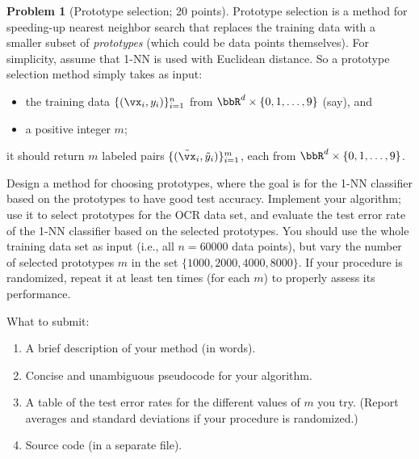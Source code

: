 \documentclass[11pt]{article}
\theoremstyle{definition}
\newtheorem{problem}{Problem}
\begin{document}
\begin{problem}[Prototype selection; 20 points]
  Prototype selection is a method for speeding-up nearest neighbor search that
  replaces the training data with a smaller subset of \emph{prototypes} (which
  could be data points themselves).
  For simplicity, assume that 1-NN is used with Euclidean distance.
  So a prototype selection method simply takes as input:
  \begin{itemize}
    \item
      the training data $\{ (\vx_i,y_i) \}_{i=1}^n$ from $\bbR^d \times
      \{0,1,\dotsc,9\}$ (say), and

    \item
      a positive integer $m$;

  \end{itemize}
  it should return $m$ labeled pairs $\{(\tilde\vx_i,\tilde y_i)\}_{i=1}^m$,
  each from $\bbR^d \times \{0,1,\dotsc,9\}$.

  Design a method for choosing prototypes, where the goal is for the 1-NN
  classifier based on the prototypes to have good test accuracy.
  Implement your algorithm; use it to select prototypes for the OCR data
  set, and evaluate the test error rate of the 1-NN classifier based on the
  selected prototypes.
  You should use the whole training data set as input (i.e., all $n=60000$ data
  points), but vary the number of selected prototypes $m$ in the set $\{ 1000,
  2000, 4000, 8000 \}$.
  If your procedure is randomized, repeat it at least ten times (for each $m$)
  to properly assess its performance.

  What to submit:
  \begin{enumerate}
    \item
      A brief description of your method (in words).

    \item
      Concise and unambiguous pseudocode for your algorithm.

    \item
      A table of the test error rates for the different values of $m$ you try.
      (Report averages and standard deviations if your procedure is randomized.)

    \item
      Source code (in a separate file).

  \end{enumerate}

\end{problem}
\end{document}
